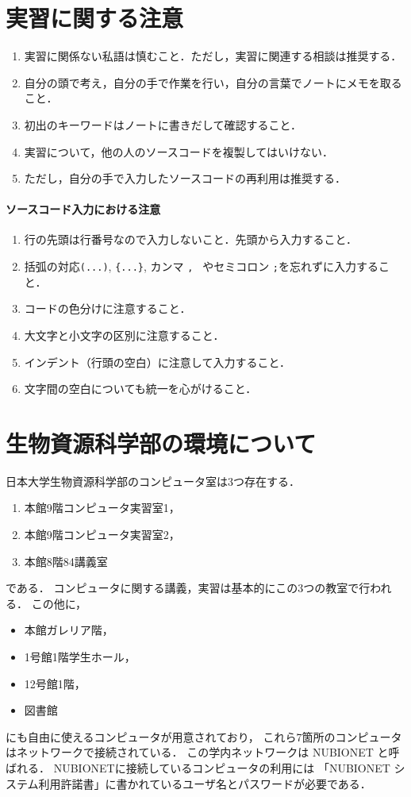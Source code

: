 \documentclass[a4j]{ltjsarticle}
\begin{document}
\section{実習に関する注意}
\begin{enumerate}
\item 実習に関係ない私語は慎むこと．ただし，実習に関連する相談は推奨する． 
\item 自分の頭で考え，自分の手で作業を行い，自分の言葉でノートにメモを取ること．
\item 初出のキーワードはノートに書きだして確認すること．
\item 実習について，他の人のソースコードを複製してはいけない．
\item ただし，自分の手で入力したソースコードの再利用は推奨する．
\end{enumerate}

\paragraph{ソースコード入力における注意}
\begin{enumerate} 
\item 行の先頭は行番号なので入力しないこと．先頭から入力すること．
\item 括弧の対応\verb|(...)|, \verb|{...}|, カンマ \verb|, | やセミコロン \verb|;|を忘れずに入力すること．
\item コードの色分けに注意すること．
\item 大文字と小文字の区別に注意すること．
\item インデント（行頭の空白）に注意して入力すること．
\item 文字間の空白についても統一を心がけること．
\end{enumerate}

\section{生物資源科学部の環境について}
日本大学生物資源科学部のコンピュータ室は3つ存在する．
\begin{enumerate}
 \item 本館9階コンピュータ実習室1，
 \item 本館9階コンピュータ実習室2，
 \item 本館8階84講義室
\end{enumerate}
である．
コンピュータに関する講義，実習は基本的にこの3つの教室で行われる．
この他に，
 \begin{itemize}
  \item 本館ガレリア階，
  \item 1号館1階学生ホール，
  \item 12号館1階，
  \item 図書館
 \end{itemize}
にも自由に使えるコンピュータが用意されており，
これら7箇所のコンピュータはネットワークで接続されている．
この学内ネットワークは NUBIONET と呼ばれる．
NUBIONETに接続しているコンピュータの利用には
「NUBIONET システム利用許諾書」に書かれているユーザ名とパスワードが必要である．
\end{document}
